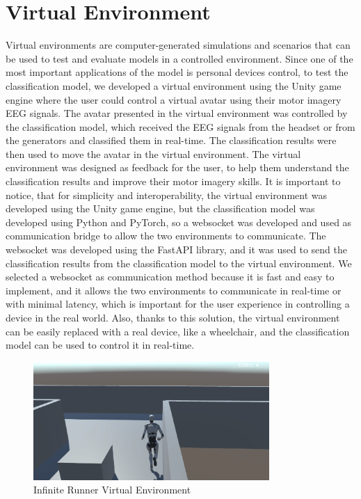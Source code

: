 \section{Virtual Environment}
Virtual environments are computer-generated simulations and scenarios that can be used to test and evaluate models in a controlled environment.
Since one of the most important applications of the model is personal devices control, to test the classification model, we developed a virtual environment using the Unity game engine where the user could control a virtual avatar using their motor imagery EEG signals.
The avatar presented in the virtual environment was controlled by the classification model, which received the EEG signals from the headset or from the generators and classified them in real-time.
The classification results were then used to move the avatar in the virtual environment.
The virtual environment was designed as feedback for the user, to help them understand the classification results and improve their motor imagery skills.
It is important to notice, that for simplicity and interoperability, the virtual environment was developed using the Unity game engine, but the classification model was developed using Python and PyTorch, so a websocket was developed and used as communication bridge to allow the two environments to communicate.
The websocket was developed using the FastAPI library, and it was used to send the classification results from the classification model to the virtual environment.
We selected a websocket as communication method because it is fast and easy to implement, and it allows the two environments to communicate in real-time or with minimal latency, which is important for the user experience in controlling a device in the real world.
Also, thanks to this solution, the virtual environment can be easily replaced with a real device, like a wheelchair, and the classification model can be used to control it in real-time.
\begin{figure}[!htbp]
    \centering
    \includegraphics[width=0.8\textwidth]{Figures/Approach/infinite_runner}
    \caption{Infinite Runner Virtual Environment}
    \label{fig:infinite_runner}
\end{figure}


